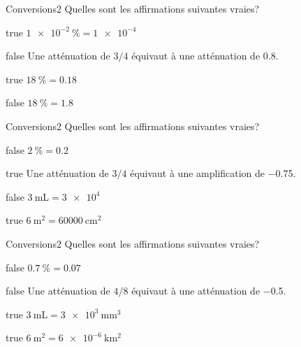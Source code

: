 \documentclass[11pt]{article}
\begin{document}
        \begin{question}{}{Conversions}{2}{}
            Quelles sont les affirmations suivantes vraies?
        \end{question}
        \begin{reponses}
            \item[true] $\SI{1e-2}{\percent} = \num{1e-4}$
            \item[false] Une atténuation de $3/4$ équivaut à une atténuation de \num{.8}.
            \item[true] $\SI{18}{\percent} = \num{0.18}$
            \item[false] $\SI{18}{\percent} = \num{1.8}$
        \end{reponses}
        
         \begin{question}{}{Conversions}{2}{}
            Quelles sont les affirmations suivantes vraies?
        \end{question}
        \begin{reponses}
            \item[false] $\SI{2}{\percent} = \num{0.2}$
            \item[true] Une atténuation de $3/4$ équivaut à une amplification de \num{-.75}.
            \item[false] $\SI{3}{\milli\liter} = \num{3e4}$
            \item[true] $\SI{6}{\meter\squared} = \SI{60000}{\centi\meter\squared}$
        \end{reponses}
    
        \begin{question}{}{Conversions}{2}{}
            Quelles sont les affirmations suivantes vraies?
        \end{question}
        \begin{reponses}
            \item[false] $\SI{0.7}{\percent} = \num{0.07}$
            \item[false] Une atténuation de $4/8$ équivaut à une atténuation de \num{-0.5}.
            \item[true] $\SI{3}{\milli\liter} = \SI{3e3}{\milli\meter\cubed}$
            \item[true] $\SI{6}{\meter\squared} = \SI{6e-6}{\kilo\meter\squared}$
        \end{reponses}
    
\end{document}
